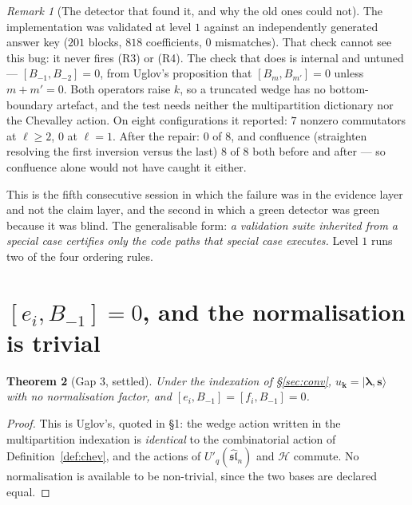 \documentclass[11pt]{article}
\newtheorem{theorem}{Theorem}[section]
\theoremstyle{definition}
\theoremstyle{remark}
\newtheorem{remark}[theorem]{Remark}
\newcommand{\bl}{\boldsymbol{\lambda}}
\newcommand{\bs}{\mathbf{s}}
\newcommand{\bk}{\mathbf{k}}
\newcommand{\ket}[1]{\lvert #1 \rangle}
\begin{document}
\begin{remark}[The detector that found it, and why the old ones could not]
\label{rem:detector}
The implementation was validated at level $1$ against an independently generated answer
key ($201$ blocks, $818$ coefficients, $0$ mismatches). That check cannot see this bug:
it never fires (R3) or (R4). The check that does is internal and untuned ---
$[B_{-1},B_{-2}]=0$, from Uglov's proposition that $[B_m,B_{m'}]=0$ unless $m+m'=0$.
Both operators raise $k$, so a truncated wedge has no bottom-boundary artefact, and the
test needs neither the multipartition dictionary nor the Chevalley action. On eight
configurations it reported: $7$ nonzero commutators at $\ell\ge2$, $0$ at $\ell=1$. After
the repair: $0$ of $8$, and confluence (straighten resolving the first inversion versus
the last) $8$ of $8$ both before and after --- so confluence alone would not have caught
it either.

This is the fifth consecutive session in which the failure was in the evidence layer and
not the claim layer, and the second in which a green detector was green because it was
blind. The generalisable form: \emph{a validation suite inherited from a special case
certifies only the code paths that special case executes.} Level $1$ runs two of the four
ordering rules.
\end{remark}

\section{$[e_i,B_{-1}]=0$, and the normalisation is trivial}\label{sec:comm}

\begin{theorem}[Gap 3, settled]\label{thm:norm}
Under the indexation of \S\ref{sec:conv}, $u_{\bk}=\ket{\bl,\bs}$ with no normalisation
factor, and $[e_i,B_{-1}]=[f_i,B_{-1}]=0$.
\end{theorem}

\begin{proof}
This is Uglov's, quoted in \S1: the wedge action written in the multipartition indexation
is \emph{identical} to the combinatorial action of Definition~\ref{def:chev}, and the
actions of $U'_q(\widehat{\mathfrak{sl}}_n)$ and $\mathcal H$ commute. No normalisation
is available to be non-trivial, since the two bases are declared equal.
\end{proof}
\end{document}
